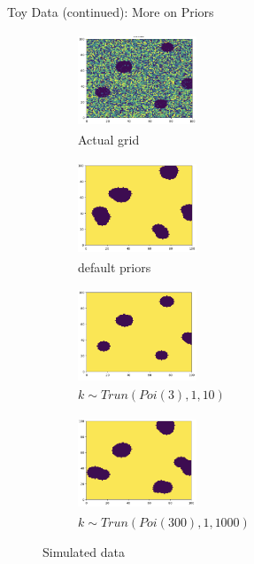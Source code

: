 \documentclass[10pt,mathserif]{beamer}
\begin{document}
\begin{frame}{Toy Data (continued): More on Priors}
\begin{figure}[t!]
    \centering
    \begin{subfigure}[t]{0.3\textwidth}
        \centering
        \includegraphics[height=1.1in, width=1.4in]{../BDC_gridactual}
        \caption{Actual grid}
    \end{subfigure}%
    \begin{subfigure}[t]{0.3\textwidth}
        \centering
        \includegraphics[height=1.1in, width=1.4in]{../BDC_grid1}
        \caption{default priors}
    \end{subfigure} %
    \begin{subfigure}[t]{0.3\textwidth}
        \centering
        \includegraphics[height=1.1in, width=1.4in]{../BDC_grid7_c3}
        \caption{ $k \sim Trun(Poi(3), 1, 10)$}
    \end{subfigure}%
        \begin{subfigure}[t]{0.3\textwidth}
        \centering
        \includegraphics[height=1.1in, width=1.4in]{../BDC_grid8_c300}
        \caption{ $k \sim Trun(Poi(300), 1, 1000)$}
    \end{subfigure}
    \caption{Simulated data}
\end{figure}
\end{frame}
\end{document}
